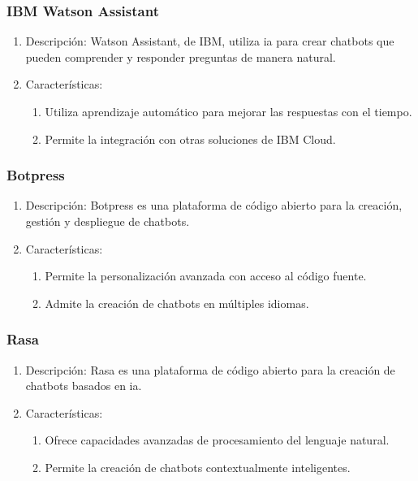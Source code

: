 \subsubsection{IBM Watson Assistant}
\begin{enumerate}
\item Descripción: Watson Assistant, de IBM, utiliza \acrshort{ia} para crear chatbots que pueden comprender y responder preguntas de manera natural.
\item Características:
\begin{enumerate}
\item Utiliza aprendizaje automático para mejorar las respuestas con el tiempo.
\item Permite la integración con otras soluciones de IBM Cloud.
\end{enumerate}
\end{enumerate}

\subsubsection{Botpress}
\begin{enumerate}
\item Descripción: Botpress es una plataforma de código abierto para la creación, gestión y despliegue de chatbots.
\item Características:
\begin{enumerate}
\item Permite la personalización avanzada con acceso al código fuente.
\item Admite la creación de chatbots en múltiples idiomas.
\end{enumerate}
\end{enumerate}

\subsubsection{Rasa}
\begin{enumerate}
\item Descripción: Rasa es una plataforma de código abierto para la creación de chatbots basados en \acrlong{ia}.
\item Características:
\begin{enumerate}
\item Ofrece capacidades avanzadas de procesamiento del lenguaje natural.
\item Permite la creación de chatbots contextualmente inteligentes.
\end{enumerate}
\end{enumerate}

